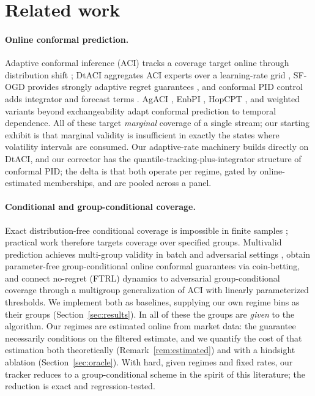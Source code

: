 \section{Related work}\label{sec:related}

\paragraph{Online conformal prediction.}
Adaptive conformal inference (ACI) tracks a coverage target online through
distribution shift \citep{gibbs2021adaptive}; DtACI aggregates ACI experts
over a learning-rate grid \citep{gibbs2022conformal}, SF-OGD provides
strongly adaptive regret guarantees \citep{bhatnagar2023improved}, and
conformal PID control adds integrator and forecast terms
\citep{angelopoulos2023conformal}. AgACI \citep{zaffran2022adaptive},
EnbPI \citep{xu2021conformal}, HopCPT \citep{auer2023conformal}, and
weighted variants beyond exchangeability \citep{barber2023conformal} adapt
conformal prediction to temporal dependence. All of these target
\emph{marginal} coverage of a single stream; our starting exhibit is that
marginal validity is insufficient in exactly the states where volatility
intervals are consumed. Our adaptive-rate machinery builds directly on
DtACI, and our corrector has the quantile-tracking-plus-integrator
structure of conformal PID; the delta is that both operate per regime,
gated by online-estimated memberships, and are pooled across a panel.

\paragraph{Conditional and group-conditional coverage.}
Exact distribution-free conditional coverage is impossible in finite
samples \citep{foygelbarber2021limits}; practical work therefore targets
coverage over specified groups. Multivalid prediction achieves multi-group
validity in batch and adversarial settings \citep{bastani2022practical},
\citet{bharti2026parameterfree} obtain parameter-free group-conditional
online conformal guarantees via coin-betting, and
\citet{ramalingam2025noregret} connect no-regret (FTRL) dynamics to
adversarial group-conditional coverage through a multigroup
generalization of ACI with linearly parameterized thresholds. We
implement both as baselines, supplying our own regime bins as their
groups (Section~\ref{sec:results}). In all of these the groups are
\emph{given} to the algorithm. Our regimes are estimated online from market data: the
guarantee necessarily conditions on the filtered estimate, and we quantify
the cost of that estimation both theoretically
(Remark~\ref{rem:estimated}) and with a hindsight ablation
(Section~\ref{sec:oracle}). With hard, given regimes and fixed rates, our
tracker reduces to a group-conditional scheme in the spirit of this
literature; the reduction is exact and regression-tested.


